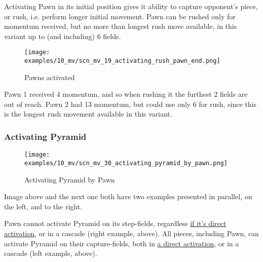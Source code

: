 Activating Pawn in its initial position gives it ability to capture opponent's
piece, or rush, i.e. perform longer initial movement. Pawn can be rushed only for
momentum received, but no more than longest rush move available, in this variant
up to (and including) 6 fields.

\clearpage %

\vspace*{-2.1\baselineskip}
\noindent
\begin{figure}[!h]
\texttt{[image: examples/10\_mv/scn\_mv\_19\_activating\_rush\_pawn\_end.png]}
\caption{Pawns activated}
\label{fig:scn_mv_19_activating_rush_pawn_end}
\end{figure}

Pawn 1 received 4 momentum, and so when rushing it the furthest 2 fields are out
of reach. Pawn 2 had 13 momentum, but could use only 6 for rush, since this is the
longest rush movement available in this variant.

\clearpage %

\subsubsection*{Activating Pyramid}

\vspace*{-1.4\baselineskip}
\noindent
\begin{figure}[!h]
\texttt{[image: examples/10\_mv/scn\_mv\_30\_activating\_pyramid\_by\_pawn.png]}
\vspace*{-1.3\baselineskip}
\caption{Activating Pyramid by Pawn}
\label{fig:scn_mv_30_activating_pyramid_by_pawn}
\end{figure}

\vspace*{-0.3\baselineskip}
Image above and the next one both have two examples presented in parallel, on the left,
and to the right.

Pawn cannot activate Pyramid on its step-fields, regardless
\hyperref[fig:scn_ma_04_pyramid_activation_by_pawn]{if it's direct activation}, or in a cascade
(right example, above). All pieces, including Pawn, can activate Pyramid on their capture-fields,
both in \hyperref[fig:scn_ma_01_pyramid_activation_init]{a direct activation}, or in a cascade
(left example, above).

